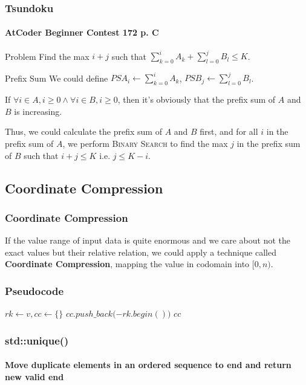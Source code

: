 \documentclass{beamer}
\begin{document}
\frame
{
	\frametitle{Tsundoku}
	\framesubtitle{AtCoder Beginner Contest 172 p. C}
	
	\begin{block}{Problem}
		Find the max $i+j$ such that $\sum_{k=0}^iA_k + \sum_{l=0}^jB_l \leq K$.
	\end{block}
	
	\pause
	
	\begin{block}{Prefix Sum}
		We could define $PSA_i\gets\sum_{k=0}^iA_k$, $PSB_j\gets\sum_{l=0}^jB_l$.\pause
		
		If $\forall i\in A, i\geq 0\land\forall i\in B, i\geq 0$, then it's obviously that the prefix sum of $A$ and $B$ is increasing.\pause
	\end{block}
	
	Thus, we could calculate the prefix sum of $A$ and $B$ first, and for all $i$ in the prefix sum of $A$, we perform \textsc{Binary Search} to find the max $j$ in the prefix sum of $B$ such that $i+j\leq K$ i.e. $j\leq K-i$.
}

\subsection{Coordinate Compression}

\frame
{
	\frametitle{Coordinate Compression}
	
	If the value range of input data is quite enormous and we care about not the exact values but their relative relation, we could apply a technique called \textbf{Coordinate Compression}, mapping the value in codomain into $[0, n)$.
}

\frame
{
	\frametitle{Pseudocode}
	
	\begin{algorithmic}
		\small
    		\State$rk\gets v, cc\gets \{\}$
			\State{}
			\State{}
				\State$cc.push\_back($$ - rk.begin())$
			\EndFor
			\State\Return$cc$
        \EndProcedure
	\end{algorithmic}
}


\frame
{
	\frametitle{\ttfamily std::unique()}
	\framesubtitle{Move duplicate elements in an ordered sequence to end and return new valid end}
	
	
}
\end{document}
